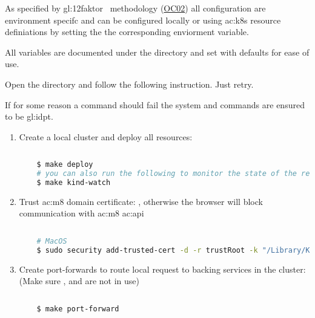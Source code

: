 As specified by \gls{gl:12faktor}~\citep{TheTwelv47} methodology (\hyperref[oc:ac02]{OC02}) all configuration are environment specifc and can be configured locally or using \gls{ac:k8s} resource definiations by setting the the corresponding enviorment variable.

All variables are documented under the directory  and set with defaults for ease of use.


Open the directory  and follow the following instruction. Just retry.

If for some reason a command should fail the system and commands are ensured to be \gls{gl:idpt}.


\begin{enumerate}
  \item Create a local cluster and deploy all resources:

  \begin{lstlisting}[language=bash, caption={Deploy all resources to a local cluster}, label={sh:dartlc}]
    
    $ make deploy
    # you can also run the following to monitor the state of the resources
    $ make kind-watch
  \end{lstlisting}

  \item Trust \gls{ac:m8} domain certificate: , otherwise the browser will block communication with \gls{ac:m8} \gls{ac:api}

  \begin{lstlisting}[language=bash, caption={Trust \gls{ac:m8} domain certificate}, label={sh:tmdc}]
    
    # MacOS
    $ sudo security add-trusted-cert -d -r trustRoot -k "/Library/Keychains/System.keychain" tmp/domain-ca.crt
  \end{lstlisting}

  \item Create port-forwards to route local request to backing services in the cluster: (Make sure ,  and  are not in use)

  \begin{lstlisting}[language=bash, caption={Create port-forwards to route local request}, label={sh:cpf}]
    
    $ make port-forward
  \end{lstlisting}


\end{enumerate}
